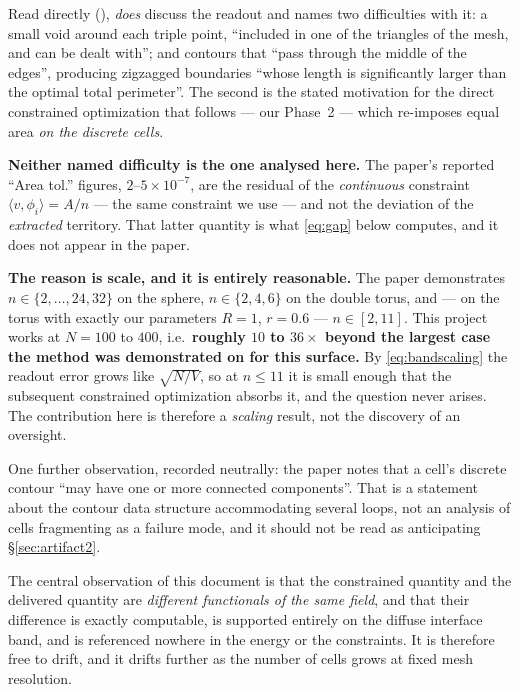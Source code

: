 \documentclass[11pt,a4paper]{article}
\begin{document}
\begin{remark}
\label{rem:what-paper-says}
Read directly (),
\cite{bogosel2017partitions} \emph{does} discuss the readout and names two
difficulties with it: a small void around each triple point, ``included in one of
the triangles of the mesh, and can be dealt with''; and contours that ``pass
through the middle of the edges'', producing zigzagged boundaries ``whose length is
significantly larger than the optimal total perimeter''. The second is the stated
motivation for the direct constrained optimization that follows --- our Phase~2 ---
which re-imposes equal area \emph{on the discrete cells}.

\textbf{Neither named difficulty is the one analysed here.} The paper's reported
``Area tol.'' figures, $2$--$5\times10^{-7}$, are the residual of the
\emph{continuous} constraint $\langle v, \phi_i\rangle = A/n$ --- the same
constraint we use --- and not the deviation of the \emph{extracted} territory. That
latter quantity is what \eqref{eq:gap} below computes, and it does not appear in
the paper.

\textbf{The reason is scale, and it is entirely reasonable.} The paper demonstrates
$n \in \{2,\dots,24,32\}$ on the sphere, $n \in \{2,4,6\}$ on the double torus, and
--- on the torus with exactly our parameters $R=1$, $r=0.6$ --- $n \in [2,11]$. This
project works at $N = 100$ to $400$, i.e.\ \textbf{roughly $10$ to $36\times$ beyond
the largest case the method was demonstrated on for this surface.} By
\eqref{eq:bandscaling} the readout error grows like $\sqrt{N/V}$, so at $n \le 11$
it is small enough that the subsequent constrained optimization absorbs it, and the
question never arises. The contribution here is therefore a \emph{scaling} result,
not the discovery of an oversight.

One further observation, recorded neutrally: the paper notes that a cell's discrete
contour ``may have one or more connected components''. That is a statement about the
contour data structure accommodating several loops, not an analysis of cells
fragmenting as a failure mode, and it should not be read as anticipating
\S\ref{sec:artifact2}.
\end{remark}

The central observation of this document is that the constrained quantity and the
delivered quantity are \emph{different functionals of the same field}, and that
their difference is exactly computable, is supported entirely on the diffuse
interface band, and is referenced nowhere in the energy or the constraints. It is
therefore free to drift, and it drifts further as the number of cells grows at
fixed mesh resolution.
\end{document}

